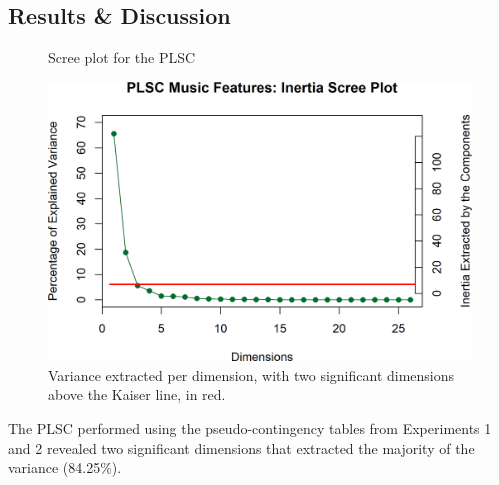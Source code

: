 \documentclass[
  english,
  man,floatsintext]{apa6}
\begin{document}
\hypertarget{results-discussion}{%
\subsection{Results \& Discussion}\label{results-discussion}}

\begin{figure}  
  \begin{center}
  \caption{Scree plot for the PLSC}
    \includegraphics{./Music-Descriptor-Space_files/figure-latex/screePLSC-1.png}
  \caption*{Variance extracted per dimension, with two significant dimensions above the Kaiser line, in red.}\label{fig:screePLSC}  
 \end{center}
\end{figure}

The PLSC performed using the pseudo-contingency tables from Experiments 1 and 2 revealed two significant dimensions that extracted the majority of the variance (84.25\%).
\end{document}

